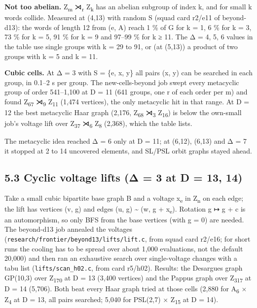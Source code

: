 \documentclass[
  10pt,
]{article}
\begin{document}
\textbf{Not too abelian.} Z\textsubscript{m} ⋊\textsubscript{r} Z\textsubscript{k} has an abelian subgroup of index k,
and for small k words collide. Measured at (4,13) with random S (squad card r2/e11 of beyond-d13): the words of length
12 from (e, A) reach 1 \% of G for k = 1, 6 \% for k = 3, 73 \% for k = 5, 91 \% for k = 9 and 97--99 \% for k ≥ 11.
The Δ = 4, 5, 6 values in the table use single groups with k = 29 to 91, or (at (5,13)) a product of two groups with k
= 5 and k = 11.

\textbf{Cubic cells.} At Δ = 3 with S = \{e, x, y\} all pairs (x, y) can be searched in each group, in 0.1--2 s per
group. The new-cells-beyond job swept every metacyclic group of order 541--1,100 at D = 11 (641 groups, one r of each
order per m) and found Z\textsubscript{67} ⋊\textsubscript{9} Z\textsubscript{11} (1,474 vertices), the only
metacyclic hit in that range. At D = 12 the best metacyclic Haar graph (2,176, Z\textsubscript{68} ⋊\textsubscript{3}
Z\textsubscript{16}) is below the own-small job's voltage lift over Z\textsubscript{37} ⋊\textsubscript{6}
Z\textsubscript{8} (2,368), which the table lists.

The metacyclic idea reached Δ = 6 only at D = 11; at (6,12), (6,13) and Δ = 7 it stopped at 2 to 14 uncovered
elements, and SL/PSL orbit graphs stayed ahead.

\hypertarget{cyclic-voltage-lifts-ux3b4-3-at-d-13-14}{%
\subsection{5.3 Cyclic voltage lifts (Δ = 3 at D = 13, 14)}\label{cyclic-voltage-lifts-ux3b4-3-at-d-13-14}}

Take a small cubic bipartite base graph B and a voltage x\textsubscript{e} in Z\textsubscript{n} on each edge; the
lift has vertices (v, g) and edges (u, g) \textasciitilde{} (w, g + x\textsubscript{e}). Rotation g ↦ g + c is an
automorphism, so only BFS from the base vertices (with g = 0) are needed. The beyond-d13 job annealed the voltages
(\texttt{research/\allowbreak{}frontier/\allowbreak{}beyond13/\allowbreak{}lifts/\allowbreak{}lift.c}, from squad card r2/e16; for short runs the cooling has to be spread
over about 1,000 evaluations, not the default 20,000) and then ran an exhaustive search over single-voltage changes
with a tabu list (\texttt{lifts/\allowbreak{}scan\_\allowbreak{}h02.c}, from card r5/h02). Results: the Desargues graph GP(10,3) over
Z\textsubscript{170} at D = 13 (3,400 vertices) and the Pappus graph over Z\textsubscript{317} at D = 14 (5,706). Both
beat every Haar graph tried at those cells (2,880 for A\textsubscript{6} × Z\textsubscript{4} at D = 13, all pairs
searched; 5,040 for PSL(2,7) × Z\textsubscript{15} at D = 14).
\end{document}
